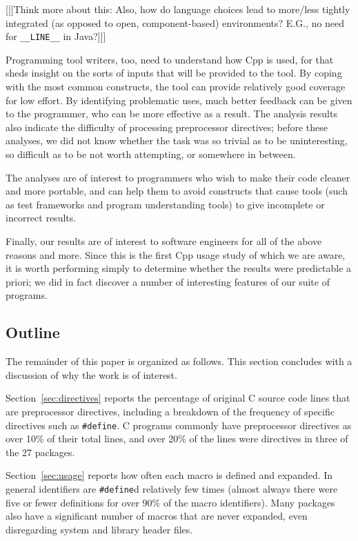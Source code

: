 \documentclass[11pt]{article}
\def\numpackages{27}
\begin{document}
[[[Think more about this:  Also, how do language choices lead to more/less
tightly integrated (as opposed to open, component-based) environments?
E.G., no need for \verb|__LINE__| in Java?]]]

Programming tool writers, too, need to understand how Cpp is used, for that
sheds insight on the sorts of inputs that will be provided to the tool.  By
coping with the most common constructs, the tool can provide relatively
good coverage for low effort.  By identifying problematic uses, much better
feedback can be given to the programmer, who can be more effective as a
result.  The analysis results also indicate the difficulty of processing
preprocessor directives; before these analyses, we did not know whether the
task was so trivial as to be uninteresting, so difficult as to be not worth
attempting, or somewhere in between.

The analyses are of interest to programmers who wish to make their code
cleaner and more portable, and can help them to avoid constructs that cause
tools (such as test frameworks and program understanding tools)
to give incomplete or incorrect results.


Finally, our results are of interest to software engineers for all of the
above reasons and more.  Since this is the first Cpp usage study of which
we are aware, it is worth performing simply to determine whether the
results were predictable a priori; we did in fact discover a number of
interesting features of our suite of programs.


\subsection{Outline}

The remainder of this paper is organized as follows.
This section concludes with a discussion of why the work is of interest.

Section~\ref{sec:directives} reports the percentage of original C source
code lines that are preprocessor directives, including a breakdown of the
frequency of specific directives such as {\tt \#define}.  C programs
commonly have preprocessor directives as over 10\% of their total lines,
and over 20\% of the lines were directives in three of the {\numpackages}
packages.

Section~\ref{sec:usage} reports how often each macro is defined and
expanded.  In general identifiers are {\tt \#define}d relatively few times
(almost always there were five or fewer definitions for over 90\% of the
macro identifiers).  Many packages also have a significant number of macros
that are never expanded, even disregarding system and library header files.
\end{document}
